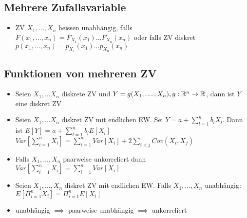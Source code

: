 \subsection{Mehrere Zufallsvariable}
\begin{itemize}
     $F: \R^n \to [0,1]$ seien $X_1, \dots, X_n$ ZV, dann:\\ $F(x_1, \dots, x_n) := P[X_1 \le x_1, \dots, X_n \le x_n]$
     $p: \R^n \to [0,1]$ seien $X_1, \dots, X_n$ diskrete ZV, dann:\\ $p(x_1, \dots, x_n) := P[X_1 = x_1, \dots, X_n = x_n]$
     Haben $X$ und $Y$ gemeinsame VF $F$, dann ist $F_X: \R \to [0,1]$ die Randverteilung von $X$\\ $F_{X(X)} := P[X \le x] = P[X \le x, Y < \infty] = \lim_{y \to \infty} F(x, y)$
     $p_X: \mc{W}(X) \to [0,1]$ von $X$ ist $p_x(x) = P[X = x] = \sum_{y_j \in \mc{W}(Y)} P[X = x, Y = y_j] = \sum_{y_j \in \mc{W}(Y)} p(x, y_j)$
\item ZV $X_1, \dots, X_n$ heissen unabhängig, falls $F(x_1, \dots, x_n) = F_{X_1}(x_1) \dots F_{X_n}(x_n)$ oder falls ZV diskret $p(x_1, \dots, x_n) = p_{X_1}(x_1) \dots p_{X_n}(x_n)$
\end{itemize}

\subsection{Funktionen von mehreren ZV}
\begin{itemize}
    \item Seien $X_1, \dots X_n$ diskrete ZV und $Y = g(X_1, \dots, X_n), g: \mathbb{R}^n \to \mathbb{R}$, dann ist $Y$ eine diskret ZV
    \item Seien $X_1, \dots X_n$ diskret ZV mit endlichen EW. Sei $Y = a + \sum_{l=1}^{n} b_l X_l$. Dann ist $E[Y] = a + \sum_{l=1}^{n} b_l E[X_l]$
    \\ $Var [\sum_{i=1}^{n} X_i] = \sum_{i=1}^{n} Var[X_i] + 2 \sum_{i<j} Cov(X_i, X_j)$
    \item Falls $X_1, \dots, X_n$ paarweise unkorreliert dann $Var[\sum_{i=1}^{n} X_i] = \sum_{i=1}^{n} Var[X_i]$
    \item Seien $X_1, \dots, X_n$ diskret ZV mit endlichen EW. Falls $X_1, \dots, X_n$ unabhängig: $E[\Pi_{i=1}^{n} X_i] = \Pi_{i=1}^{n} E[X_i]$
    \item unabhängig $\implies$ paarweise unabhängig $\implies$ unkorreliert
\end{itemize}

